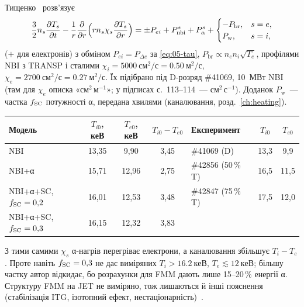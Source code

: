 \begin{corpusexample}
Тищенко~\cite[с.~108--109, (4.52)--(4.54)]{Tyshchenko2021} розв'язує
\begin{equation}\label{eq:05-tysh}
  \frac32n_s\frac{\partial T_s}{\partial t}-\frac1r\frac{\partial}{\partial r}\Big(rn_s\chi_{s}\frac{\partial T_s}{\partial r}\Big)=\pm P_{ei}+P^{s}_{\mathrm{nbi}}+P^{s}_{\alpha}+\begin{cases}-P_{\mathrm{br}}, & s=e,\\ P_{\mathrm w}, & s=i,\end{cases}
\end{equation}
($+$ для електронів) з обміном $P_{ei}=P_{\Delta e}$ за \eqref{eq:05-tau}, $P_{\mathrm{br}}\propto n_en_i\sqrt{T_e}$, профілями NBI з TRANSP і сталими $\chi_{i}=\SI{5000}{см^2/с}=\SI{0,50}{м^2/с}$, $\chi_{e}=\SI{2700}{см^2/с}=\SI{0,27}{м^2/с}$. Їх підібрано під D-розряд \#41069, 10~МВт NBI~\cite[с.~111]{Tyshchenko2021} (там для $\chi_{e}$ описка «см$^2$\,м$^{-1}$»; у підписах с.~113--114~--- см$^2$\,с$^{-1}$). Доданок $P_{\mathrm w}$~--- частка $f_{\mathrm{SC}}$ потужності α, передана хвилями (каналювання, розд.~\ref{ch:heating}).

\begin{center}\small\setlength{\tabcolsep}{4pt}
\begin{tabular}{lccc|lcc}
\toprule
Модель~\cite[с.~114, табл.~4.2]{Tyshchenko2021} & $T_{i0}$, кеВ & $T_{e0}$, кеВ & $T_{i0}-T_{e0}$ & Експеримент~\cite[с.~86]{Tyshchenko2021} & $T_{i0}$ & $T_{e0}$\\
\midrule
NBI & 13,35 & 9,90 & 3,45 & \#41069 (D) & 13,3 & 9,9\\
NBI+α & 15,71 & 12,96 & 2,75 & \#42856 (50\,\% T) & 16,5 & 11,5\\
NBI+α+SC, $f_{\mathrm{SC}}=0{,}2$ & 16,01 & 12,53 & 3,48 & \#42847 (75\,\% T) & 17,5 & 12,0\\
NBI+α+SC, $f_{\mathrm{SC}}=0{,}3$ & 16,15 & 12,32 & 3,83 & & & \\
\bottomrule
\end{tabular}
\end{center}
З тими самими $\chi_{s}$ α-нагрів перегріває електрони, а каналювання збільшує $T_i-T_e$. Проте навіть $f_{\mathrm{SC}}=0{,}3$ не дає виміряних $T_i>\SI{16,2}{кеВ}$, $T_e\lesssim\SI{12}{кеВ}$; більшу частку автор відкидає, бо розрахунки для FMM дають лише 15--20\,\% енергії α. Структуру FMM на JET не виміряно, тож лишаються й інші пояснення (стабілізація ITG, ізотопний ефект, нестаціонарність)~\cite[с.~115, 117]{Tyshchenko2021}.
\end{corpusexample}

